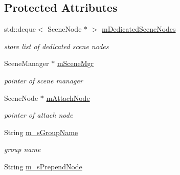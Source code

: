 \subsection*{Protected Attributes}
\begin{DoxyCompactItemize}
\item 
std\+::deque$<$ Scene\+Node $\ast$ $>$ \hyperlink{class_ogre_1_1_dot_scene_loader_a39d558e05f28c56f01023f493d5582e3}{m\+Dedicated\+Scene\+Nodes}\hypertarget{class_ogre_1_1_dot_scene_loader_a39d558e05f28c56f01023f493d5582e3}{}\label{class_ogre_1_1_dot_scene_loader_a39d558e05f28c56f01023f493d5582e3}

\begin{DoxyCompactList}\small\item\em store list of dedicated scene nodes \end{DoxyCompactList}\item 
Scene\+Manager $\ast$ \hyperlink{class_ogre_1_1_dot_scene_loader_a0e9bb576dd713972cbffa556a9db46ba}{m\+Scene\+Mgr}\hypertarget{class_ogre_1_1_dot_scene_loader_a0e9bb576dd713972cbffa556a9db46ba}{}\label{class_ogre_1_1_dot_scene_loader_a0e9bb576dd713972cbffa556a9db46ba}

\begin{DoxyCompactList}\small\item\em pointer of scene manager \end{DoxyCompactList}\item 
Scene\+Node $\ast$ \hyperlink{class_ogre_1_1_dot_scene_loader_a125a76b2ab6e09f52666bad72ff0de8b}{m\+Attach\+Node}\hypertarget{class_ogre_1_1_dot_scene_loader_a125a76b2ab6e09f52666bad72ff0de8b}{}\label{class_ogre_1_1_dot_scene_loader_a125a76b2ab6e09f52666bad72ff0de8b}

\begin{DoxyCompactList}\small\item\em pointer of attach node \end{DoxyCompactList}\item 
String \hyperlink{class_ogre_1_1_dot_scene_loader_a5145c90376120779948da8ac34de3444}{m\+\_\+s\+Group\+Name}\hypertarget{class_ogre_1_1_dot_scene_loader_a5145c90376120779948da8ac34de3444}{}\label{class_ogre_1_1_dot_scene_loader_a5145c90376120779948da8ac34de3444}

\begin{DoxyCompactList}\small\item\em group name \end{DoxyCompactList}\item 
String \hyperlink{class_ogre_1_1_dot_scene_loader_a24a2165fe05ca325d04cb2ec2928558e}{m\+\_\+s\+Prepend\+Node}\hypertarget{class_ogre_1_1_dot_scene_loader_a24a2165fe05ca325d04cb2ec2928558e}{}\label{class_ogre_1_1_dot_scene_loader_a24a2165fe05ca325d04cb2ec2928558e}


\end{DoxyCompactItemize}
